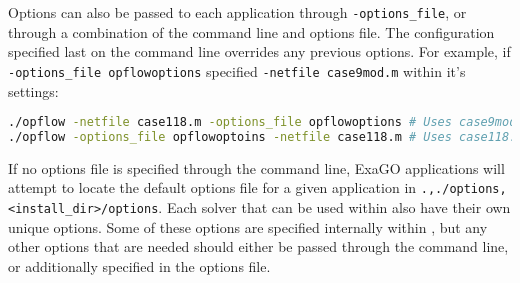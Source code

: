 Options can also be passed to each application through \lstinline{-options_file}, or through a combination of the command line and options file. The configuration specified last on the command line overrides any previous options. For example, if \lstinline{-options_file opflowoptions} specified \lstinline{-netfile case9mod.m} within it's settings:
\begin{lstlisting}[language=bash]
./opflow -netfile case118.m -options_file opflowoptions # Uses case9mod.m
./opflow -options_file opflowoptoins -netfile case118.m # Uses case118.m
\end{lstlisting}
If no options file is specified through the command line, ExaGO applications will attempt to locate the default options file for a given application in \lstinline{.,./options,<install_dir>/options}.
Each solver that can be used within \exago also have their own unique options. Some of these options are specified internally within \exago, but any other options that are needed should either be passed through the command line, or additionally specified in the options file.
